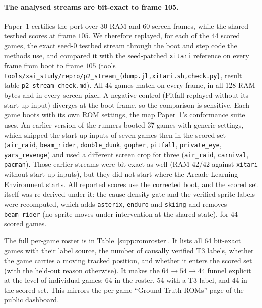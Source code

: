 \paragraph{The analysed streams are bit-exact to frame 105.} Paper~1 certifies the port over 30 RAM
and 60 screen frames, while the shared testbed scores at frame $105$. We therefore replayed, for
each of the 44 scored games, the exact seed-0 testbed stream through the boot and step code the
methods use, and compared it with the seed-patched \texttt{xitari} reference on every frame from
boot to frame $105$ (tools \texttt{tools/xai\_study/repro/p2\_stream\_\{dump.jl,xitari.sh,check.py\}},
result table \texttt{p2\_stream\_check.md}). All 44 games match on every frame, in all 128 RAM
bytes and in every screen pixel. A negative control (Pitfall replayed without its start-up input)
diverges at the boot frame, so the comparison is sensitive. Each game boots with its own ROM
settings, the map Paper~1's conformance suite uses. An earlier version of the runners booted 37
games with generic settings, which skipped the start-up inputs of seven games then in the scored set
(\texttt{air\_raid}, \texttt{beam\_rider}, \texttt{double\_dunk}, \texttt{gopher},
\texttt{pitfall}, \texttt{private\_eye}, \texttt{yars\_revenge}) and used a different screen crop
for three (\texttt{air\_raid}, \texttt{carnival}, \texttt{pacman}). Those earlier streams were
bit-exact as well (RAM 42/42 against \texttt{xitari} without start-up inputs), but they did not
start where the Arcade Learning Environment starts. All reported scores use the corrected boot, and the scored set itself was re-derived under it: the cause-density gate and the verified sprite labels were recomputed, which adds \texttt{asterix}, \texttt{enduro} and \texttt{skiing} and removes \texttt{beam\_rider} (no sprite moves under intervention at the shared state), for 44 scored games.

The full per-game roster is in Table~\ref{supp:romroster}. It lists all 64 bit-exact games with
their label source, the number of causally verified T3 labels, whether the game carries a moving
tracked position, and whether it enters the scored set (with the held-out reason otherwise).
It makes the $64\rightarrow54\rightarrow44$ funnel explicit at the level of individual games: 64
in the roster, 54 with a T3 label, and 44 in the scored set. This mirrors the per-game
``Ground Truth ROMs'' page of the public dashboard.

